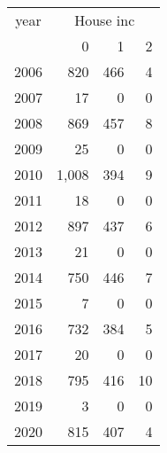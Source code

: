 \footnotesize\begin{tabular}[t]{lrrr}
\toprule
\multicolumn{1}{c}{year} & \multicolumn{3}{c}{House inc} \\
\cmidrule(l{3pt}r{3pt}){1-1} \cmidrule(l{3pt}r{3pt}){2-4}
  & 0 & 1 & 2\\
\midrule
2006 & 820 & 466 & 4\\
2007 & 17 & 0 & 0\\
2008 & 869 & 457 & 8\\
2009 & 25 & 0 & 0\\
2010 & 1,008 & 394 & 9\\
2011 & 18 & 0 & 0\\
2012 & 897 & 437 & 6\\
2013 & 21 & 0 & 0\\
2014 & 750 & 446 & 7\\
2015 & 7 & 0 & 0\\
2016 & 732 & 384 & 5\\
2017 & 20 & 0 & 0\\
2018 & 795 & 416 & 10\\
2019 & 3 & 0 & 0\\
2020 & 815 & 407 & 4\\
\bottomrule
\end{tabular}
